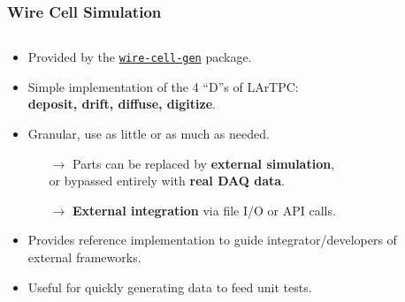 \documentclass[xcolor=dvipsnames]{beamer}
\begin{document}
\begin{frame}

  \frametitle{Wire Cell Simulation}

  \begin{columns}
    \begin{column}{0.75\textwidth}
      \begin{itemize}\footnotesize
      \item Provided by the \href{https://github.com/WireCell/wire-cell-gen}{\texttt{wire-cell-gen}} package.
      \item Simple implementation of the 4 ``D''s of LArTPC:\\
        \textbf{deposit, drift, diffuse, digitize}.
      \item Granular, use as little or as much as needed.
        \begin{itemize}\scriptsize
        \item[$\rightarrow$] Parts can be replaced by \textbf{external
          simulation}, \\or bypassed entirely with \textbf{real DAQ data}.
        \item[$\rightarrow$] \textbf{External integration} via file I/O or API calls.
        \end{itemize}
      \item Provides reference implementation to guide integrator/developers of external frameworks.
      \item Useful for quickly generating data to feed unit tests.
      \end{itemize}
    \end{column}
    \begin{column}{0.25\textwidth}
      \vspace{-10mm}

\end{column}
\end{columns}
\end{frame}
\end{document}
